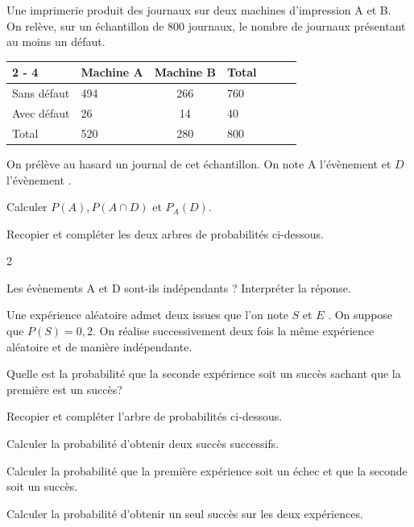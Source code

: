 \documentclass[11pt,a4paper]{article}  %
\begin{document}
Une imprimerie produit des journaux sur deux machines d'impression A et B.\\
On relève, sur un échantillon de 800 journaux, le nombre de journaux présentant au moins un défaut.\\
\begin{tabular}{|l|Xc|Xc|Xc|}
	\cline { 2 - 4 } \multicolumn{1}{Xc|}{} & Machine A & Machine B & Total \\
	\hline Sans défaut & 494 & 266 & 760 \\
	\hline Avec défaut & 26 & 14 & 40 \\
	\hline Total & 520 & 280 & 800 \\
	\hline
\end{tabular}


On prélève au hasard un journal de cet échantillon. On note A l'évènement  et $D$ l'évènement .
\begin{enumMet}
	\item Calculer $P(A), P(A \cap D)$ et $P_A(D)$.
	\item Recopier et compléter les deux arbres de probabilités ci-dessous.
	\begin{multicols}{2}
		
	\end{multicols}
	\item Les évènements A et D sont-ils indépendants ? Interpréter la réponse.
\end{enumMet}

Une expérience aléatoire admet deux issues que l'on note $S$  et $E$ . On suppose que $P(S)=0,2$. On réalise successivement deux fois la même expérience aléatoire et de manière indépendante.
\begin{enumMet}
	\item Quelle est la probabilité que la seconde expérience soit un succès sachant que la première est un succès?
	\item Recopier et compléter l'arbre de probabilités ci-dessous.\\
	\item Calculer la probabilité d'obtenir deux succès successifs.
	\item Calculer la probabilité que la première expérience soit un échec et que la seconde soit un succès.
	\item Calculer la probabilité d'obtenir un seul succès sur les deux expériences.
\end{enumMet}
\end{document}
